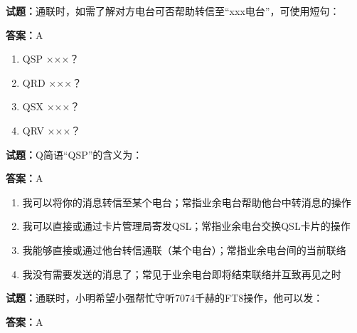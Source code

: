 \documentclass{ctexbook}
\begin{document}




\vspace{1em}

\textbf{试题：}通联时，如需了解对方电台可否帮助转信至“xxx电台”，可使用短句： 

\textbf{答案：}A 

\begin{enumerate}[leftmargin=3em]
  \item QSP ×××？ 

  \item QRD ×××？ 

  \item QSX ×××？ 

  \item QRV ×××？ 

\end{enumerate}





\vspace{1em}

\textbf{试题：}Q简语“QSP”的含义为： 

\textbf{答案：}A 

\begin{enumerate}[leftmargin=3em]
  \item 我可以将你的消息转信至某个电台；常指业余电台帮助他台中转消息的操作 

  \item 我可以直接或通过卡片管理局寄发QSL；常指业余电台交换QSL卡片的操作 

  \item 我能够直接或通过他台转信通联（某个电台）；常指业余电台间的当前联络 

  \item 我没有需要发送的消息了；常见于业余电台即将结束联络并互致再见之时 

\end{enumerate}





\vspace{1em}

\textbf{试题：}通联时，小明希望小强帮忙守听7074千赫的FT8操作，他可以发： 

\textbf{答案：}A 
\end{document}
